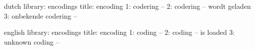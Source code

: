 




\unprotect 

\startmessages  dutch  library: encodings
  title: encoding
      1: codering --
      2: codering -- wordt geladen
      3: onbekende codering --
\stopmessages

\startmessages  english  library: encodings
  title: encoding
      1: coding --
      2: coding -- is loaded
      3: unknown coding --
\stopmessages


